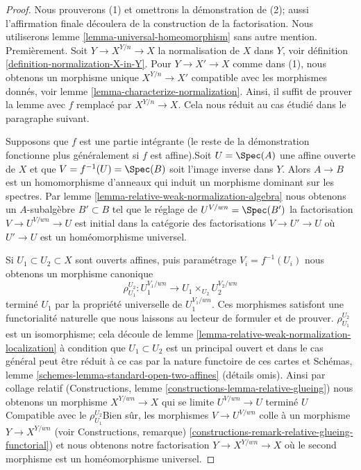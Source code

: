 \begin{proof}
Nous prouverons (1) et omettrons la démonstration de (2); aussi l'affirmation finale découlera de la construction de la factorisation. Nous utiliserons lemme \ref{lemma-universal-homeomorphism} sans autre mention. Premièrement. Soit $Y \to X^{Y/n} \to X$ la normalisation de $X$ dans $Y$, voir définition \ref{definition-normalization-X-in-Y}. Pour $Y \to X' \to X$ comme dans (1), nous obtenons un morphisme unique $X^{Y/n} \to X'$ compatible avec les morphismes donnés, voir lemme \ref{lemma-characterize-normalization}. Ainsi, il suffit de prouver la lemme avec $f$ remplacé par $X^{Y/n} \to X$. Cela nous réduit au cas étudié dans le paragraphe suivant.

\medskip\noindent
Supposons que $f$ est une partie intégrante (le reste de la démonstration fonctionne plus généralement si $f$ est affine).Soit $U = \Spec(A)$ une affine ouverte de $X$ et que $V = f^{-1}(U) = \Spec(B)$ soit l'image inverse dans $Y$. Alors $A \to B$ est un homomorphisme d'anneaux qui induit un morphisme dominant sur les spectres. Par lemme \ref{lemma-relative-weak-normalization-algebra} nous obtenons un $A$-subalgèbre $B' \subset B$ tel que le réglage de $U^{V/wn} = \Spec(B')$ la factorisation $V \to U^{V/wn} \to U$ est initial dans la catégorie des factorisations $V \to U' \to U$ où $U' \to U$ est un homéomorphisme universel.

\medskip\noindent

Si $U_1 \subset U_2 \subset X$ sont ouverts affines, puis paramétrage
$V_i = f^{-1}(U_i)$ nous obtenons un morphisme canonique
$$
\rho_{U_1}^{U_2} : U_1^{V_1/wn} \to U_1 \times_{U_2} U_2^{V_2/wn}
$$
terminé $U_1$ par la propriété universelle de $U_1^{V_1/wn}$. Ces morphismes satisfont une functorialité naturelle que nous laissons au lecteur de formuler et de prouver. $\rho_{U_1}^{U_2}$
est un isomorphisme; cela découle de lemme \ref{lemma-relative-weak-normalization-localization}
à condition que $U_1 \subset U_2$ est un principal ouvert et dans le cas général peut être réduit à ce cas par la nature functoire de ces cartes et Schémas, lemme \ref{schemes-lemma-standard-open-two-affines}
(détails omis). Ainsi par collage relatif (Constructions, lemme \ref{constructions-lemma-relative-glueing}) nous obtenons un morphisme $X^{Y/wn} \to X$ qui se limite $U^{V/wn} \to U$ terminé $U$ Compatible avec le $\rho_{U_1}^{U_2}$Bien sûr, les morphismes $V \to U^{V/wn}$ colle à un morphisme $Y \to X^{Y/wn}$
(voir Constructions, remarque)
\ref{constructions-remark-relative-glueing-functorial}) et nous obtenons notre factorisation $Y \to X^{Y/wn} \to X$ où le second morphisme est un homéomorphisme universel.


\end{proof}
